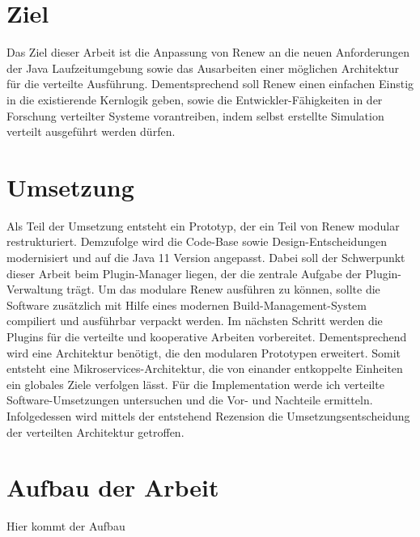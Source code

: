 \section{Ziel} 
Das Ziel dieser Arbeit ist die Anpassung von Renew an die neuen Anforderungen der Java Laufzeitumgebung sowie das Ausarbeiten einer möglichen Architektur für die verteilte Ausführung. Dementsprechend soll Renew einen einfachen Einstig in die existierende Kernlogik geben, sowie die Entwickler-Fähigkeiten in der Forschung verteilter Systeme vorantreiben, indem  selbst erstellte Simulation verteilt ausgeführt werden dürfen.

\section{Umsetzung}
Als Teil der Umsetzung entsteht ein Prototyp, der ein Teil von Renew modular restrukturiert. 
Demzufolge wird die Code-Base sowie Design-Entscheidungen modernisiert und auf die Java 11 Version angepasst.
Dabei soll der Schwerpunkt dieser Arbeit beim Plugin-Manager liegen, der die zentrale Aufgabe der Plugin-Verwaltung trägt.    
Um das modulare Renew ausführen zu können, sollte die Software zusätzlich mit Hilfe eines modernen Build-Management-System compiliert und ausführbar verpackt werden. 
Im nächsten Schritt werden die Plugins für die verteilte und kooperative Arbeiten vorbereitet. Dementsprechend wird eine Architektur benötigt, die den modularen Prototypen erweitert. 
Somit entsteht eine Mikroservices-Architektur, die von einander entkoppelte Einheiten ein globales Ziele verfolgen lässt. \newline 
Für die Implementation werde ich verteilte Software-Umsetzungen untersuchen und die Vor- und Nachteile ermitteln.
Infolgedessen wird mittels der entstehend Rezension die Umsetzungsentscheidung der verteilten Architektur getroffen.



\section{Aufbau der Arbeit}
Hier kommt der Aufbau 

